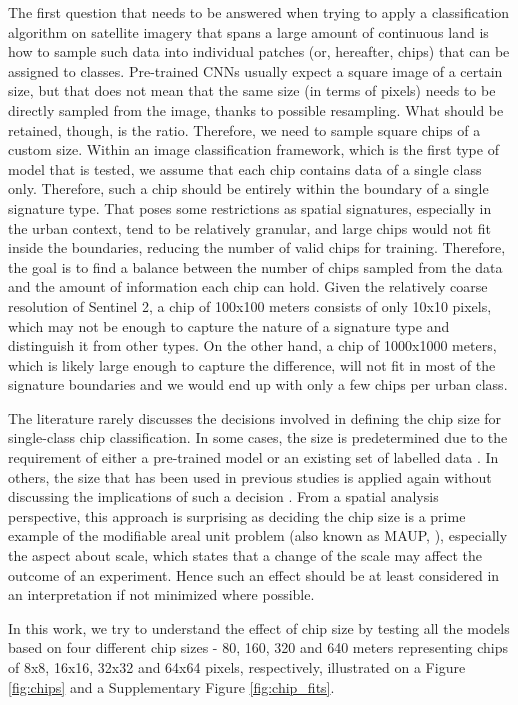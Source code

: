 
The first question that needs to be answered when trying to apply a classification
algorithm on satellite imagery that spans a large amount of continuous land is how
to sample such data into individual patches (or, hereafter, chips)
that can be assigned to classes. Pre-trained CNNs usually expect a square image of
a certain size, but that does not mean that the same size (in terms of pixels) needs to
be directly sampled from the image, thanks to possible resampling. What should be
retained, though, is the ratio. Therefore, we need to sample square chips of a
custom size. Within an image classification framework, which is the first type of model that is tested, we assume that
each chip contains data of a single class only. Therefore, such a chip should be entirely
within the boundary of a single signature type. That poses some restrictions as spatial
signatures, especially in the urban context, tend to be relatively granular, and large chips
would not fit inside the boundaries, reducing the number of
valid chips for training. Therefore, the goal is to find a balance
between the number of chips sampled from the data and the amount of
information each chip can hold. Given the relatively coarse resolution of Sentinel 2, a
chip of 100x100 meters consists of only 10x10 pixels, which may not be enough to capture
the nature of a signature type and distinguish it from other types. On the other hand, a
chip of 1000x1000 meters, which is likely large enough to capture the difference, will
not fit in most of the signature boundaries and we would end up with only a few chips per
urban class.

The literature rarely discusses the decisions involved in defining the chip
size for single-class chip classification. In some cases, the size is predetermined due to the requirement of either a
pre-trained model or an existing set of labelled data \citep{taubenbock2020}. In
others, the size that has
been used in previous studies is applied again without discussing the implications
of such a decision \citep{wang2018mapping}. From a spatial analysis
perspective, this approach is surprising as deciding the chip size is a prime example of the
modifiable areal unit problem (also known as MAUP,
\citealp{openshaw1981modifiable}), especially the aspect about scale, which states that
a change of the scale may affect the outcome of an experiment. Hence such an effect
should be at least considered in an interpretation if not minimized where possible.

In this work, we try to understand the effect of chip size by testing all the models
based on four different chip sizes - 80, 160, 320 and 640 meters representing chips of
8x8, 16x16, 32x32 and 64x64 pixels, respectively, illustrated on a Figure \ref{fig:chips}
and a Supplementary Figure \ref{fig:chip_fits}.


